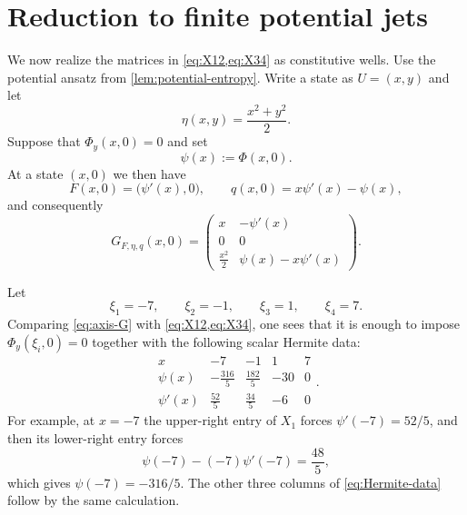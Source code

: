 \documentclass[11pt,reqno]{amsart}
\theoremstyle{definition}
\begin{document}
\section{Reduction to finite potential jets}
\label{sec:jets}

We now realize the matrices in \cref{eq:X12,eq:X34} as constitutive wells.
Use the potential ansatz from \cref{lem:potential-entropy}.  Write a state as
$U=(x,y)$ and let
\begin{equation}
  \eta(x,y)=\frac{x^2+y^2}{2}.
\end{equation}
Suppose that $\Phi_y(x,0)=0$ and set
\begin{equation}
  \psi(x):=\Phi(x,0).
\end{equation}
At a state $(x,0)$ we then have
\begin{equation}
  F(x,0)=\bigl(\psi'(x),0\bigr),
  \qquad
  q(x,0)=x\psi'(x)-\psi(x),
  \label{eq:axis-flux-q}
\end{equation}
and consequently
\begin{equation}
  G_{F,\eta,q}(x,0)
  =
  \begin{pmatrix}
    x&-\psi'(x)\\
    0&0\\
    \frac{x^2}{2}&\psi(x)-x\psi'(x)
  \end{pmatrix}.
  \label{eq:axis-G}
\end{equation}

Let
\begin{equation}
  \xi_1=-7,
  \qquad \xi_2=-1,
  \qquad \xi_3=1,
  \qquad \xi_4=7.
\end{equation}
Comparing \cref{eq:axis-G} with \cref{eq:X12,eq:X34}, one sees that it is
enough to impose $\Phi_y(\xi_i,0)=0$ together with the following scalar
Hermite data:
\begin{equation}
\renewcommand{\arraystretch}{1.25}
\begin{array}{c|rrrr}
  x&-7&-1&1&7\\
  \hline
  \psi(x)&-\frac{316}{5}&\frac{182}{5}&-30&0\\[1mm]
  \psi'(x)&\frac{52}{5}&\frac{34}{5}&-6&0
\end{array}.
\label{eq:Hermite-data}
\end{equation}
For example, at $x=-7$ the upper-right entry of $X_1$ forces
$\psi'(-7)=52/5$, and then its lower-right entry forces
\begin{equation}
  \psi(-7)-(-7)\psi'(-7)=\frac{48}{5},
\end{equation}
which gives $\psi(-7)=-316/5$.  The other three columns of
\cref{eq:Hermite-data} follow by the same calculation.
\end{document}
